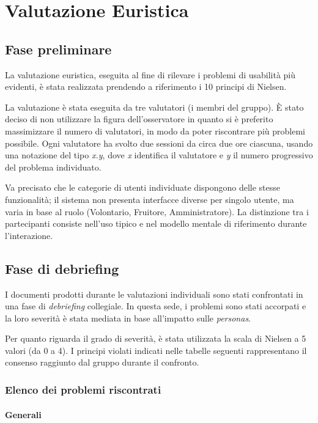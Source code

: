 \chapter{Valutazione Euristica}

\section{Fase preliminare}
La valutazione euristica, eseguita al fine di rilevare i problemi di usabilità più evidenti, è stata realizzata prendendo a riferimento i 10 principi di Nielsen.

La valutazione è stata eseguita da tre valutatori (i membri del gruppo). È stato deciso di non utilizzare la figura dell'osservatore in quanto si è preferito massimizzare il numero di valutatori, in modo da poter riscontrare più problemi possibile. Ogni valutatore ha svolto due sessioni da circa due ore ciascuna, usando una notazione del tipo \textit{x.y}, dove \textit{x} identifica il valutatore e \textit{y} il numero progressivo del problema individuato.

Va precisato che le categorie di utenti individuate dispongono delle stesse funzionalità; il sistema non presenta interfacce diverse per singolo utente, ma varia in base al ruolo (Volontario, Fruitore, Amministratore). La distinzione tra i partecipanti consiste nell'uso tipico e nel modello mentale di riferimento durante l'interazione.

\section{Fase di debriefing}
I documenti prodotti durante le valutazioni individuali sono stati confrontati in una fase di \textit{debriefing} collegiale. In questa sede, i problemi sono stati accorpati e la loro severità è stata mediata in base all'impatto sulle \textit{personas}.

Per quanto riguarda il grado di severità, è stata utilizzata la scala di Nielsen a 5 valori (da 0 a 4). I principi violati indicati nelle tabelle seguenti rappresentano il consenso raggiunto dal gruppo durante il confronto.

\newpage
\subsection{Elenco dei problemi riscontrati}
\subsubsection{Generali}

